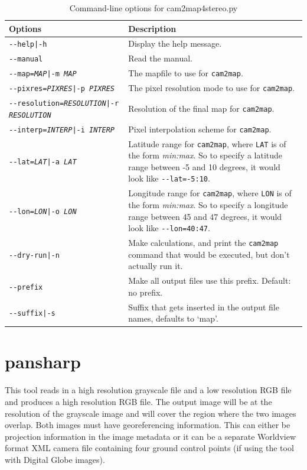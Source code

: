 \begin{longtable}{|l|p{10cm}|}
\caption{Command-line options for cam2map4stereo.py}
\label{tbl:bundlevis}
\endfirsthead
\endhead
\endfoot
\endlastfoot
\hline
Options & Description \\ \hline \hline
\texttt{-\/-help|-h} & Display the help message. \\ \hline
\texttt{-\/-manual} & Read the manual. \\ \hline
\texttt{-\/-map=\textit{MAP}|-m \textit{MAP}} & The mapfile to use for \texttt{cam2map}. \\ \hline
\texttt{-\/-pixres=\textit{PIXRES}|-p \textit{PIXRES}} & The pixel resolution mode to use for \texttt{cam2map}. \\ \hline
\texttt{-\/-resolution=\textit{RESOLUTION}|-r \textit{RESOLUTION}} & Resolution of the final map for \texttt{cam2map}. \\ \hline
\texttt{-\/-interp=\textit{INTERP}|-i \textit{INTERP}} & Pixel interpolation scheme for \texttt{cam2map}. \\ \hline
\texttt{-\/-lat=\textit{LAT}|-a \textit{LAT}} & Latitude range for \texttt{cam2map}, where \texttt{LAT} is of the form \textit{min:max}.  So to specify a latitude range between -5 and 10 degrees, it would look like \texttt{-\/-lat=-5:10}. \\ \hline
\texttt{-\/-lon=\textit{LON}|-o \textit{LON}} & Longitude range for \texttt{cam2map}, where \texttt{LON} is of the form \textit{min:max}.  So to specify a longitude range between 45 and 47 degrees, it would look like \texttt{-\/-lon=40:47}. \\ \hline
\texttt{-\/-dry-run|-n} & Make calculations, and print the \texttt{cam2map} command that would be executed, but don't actually run it.\\ \hline
\texttt{-\/-prefix} & Make all output files use this prefix. Default: no prefix.\\ \hline
\texttt{-\/-suffix|-s} & Suffix that gets inserted in the output file names, defaults to `map'.\\ \hline
\end{longtable}

\clearpage



\section{pansharp}
\label{pansharp}

This tool reads in a high resolution grayscale file and a low resolution RGB file and produces
a high resolution RGB file.  The output image will be at the resolution of the grayscale image
and will cover the region where the two images overlap.  Both images must have georeferencing
information.  This can either be projection information in the image metadata or it can be a
separate Worldview format XML camera file containing four ground control points
(if using the tool with Digital Globe images).


